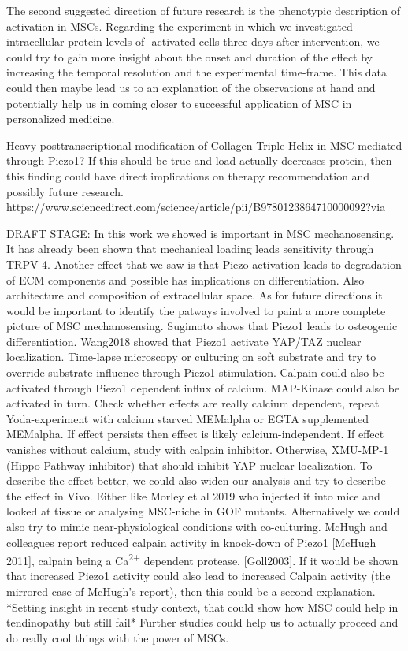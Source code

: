 The second suggested direction of future research is the phenotypic description of \Piezo{} activation in MSCs. Regarding the experiment in which we investigated intracellular protein levels of \Piezo{}-activated cells three days after intervention, we could try to gain more insight about the onset and duration of the effect by increasing the temporal resolution and the experimental time-frame. This data could then maybe lead us to an explanation of the observations at hand and potentially help us in coming closer to successful application of MSC in personalized medicine.

Heavy posttranscriptional modification of Collagen Triple Helix in MSC mediated through Piezo1? If this should be true and load actually decreases protein, then this finding could have direct implications on therapy recommendation and possibly future research. https://www.sciencedirect.com/science/article/pii/B9780123864710000092?via%


DRAFT STAGE: 
In this work we showed \Piezo{} is important in MSC mechanosensing. It has already been shown that mechanical loading leads sensitivity through TRPV-4.  Another effect that we saw is that Piezo activation leads to degradation of ECM components and possible has implications on differentiation. Also architecture and composition of extracellular space.
As for future directions it would be important to identify the patways involved to paint a more complete picture of MSC mechanosensing. Sugimoto shows that Piezo1 leads to osteogenic differentiation. Wang2018 showed that Piezo1 activate YAP/TAZ nuclear localization. Time-lapse microscopy or culturing on soft substrate and try to override substrate influence through Piezo1-stimulation. Calpain could also be activated through Piezo1 dependent influx of calcium. MAP-Kinase could also be activated in turn.  Check whether effects are really calcium dependent, repeat Yoda-experiment with calcium starved MEMalpha or EGTA supplemented MEMalpha. If effect persists then effect is likely calcium-independent. If effect vanishes without calcium, study with calpain inhibitor. Otherwise, XMU-MP-1 (Hippo-Pathway inhibitor) that should inhibit YAP nuclear localization. To describe the effect better, we could also widen our analysis and try to describe the effect in Vivo. Either like Morley et al 2019 who injected it into mice and looked at tissue or analysing MSC-niche in GOF mutants. Alternatively we could also try to mimic near-physiological conditions with co-culturing.
McHugh and colleagues report reduced calpain activity in knock-down of Piezo1 [McHugh 2011], calpain being a Ca\textsuperscript{2+} dependent protease. [Goll2003]. If it would be shown that increased Piezo1 activity could also lead to increased Calpain activity (the mirrored case of McHugh's report), then this could be a second explanation.
*Setting insight in recent study context, that could show how MSC could help in tendinopathy but still fail* Further studies could help us to actually proceed and do really cool things with the power of MSCs. 
